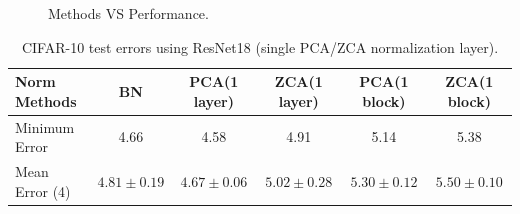 \begin{figure}[!htb]
\begin{floatrow}
{%
  \caption{Methods VS Performance.}%
}
\end{floatrow}
\end{figure}


\begin{table}[!htb]
\begin{centering}
\begin{tabular}{|l|c|c|c|c|c|}
\hline
Norm Methods          & BN        & PCA(1 layer)   & ZCA(1 layer)  & PCA(1 block)   & ZCA(1 block) \\ \hline
Minimum Error         & 4.66      &  4.58  &   4.91 &  5.14 &  5.38\\ \hline
Mean Error (4) & $4.81{\pm}0.19$  &  $4.67{\pm}0.06$  & $5.02{\pm}0.28$ & $5.30{\pm}0.12$ & $5.50{\pm}0.10$ \\ \hline
\end{tabular}
\caption{CIFAR-10 test errors using ResNet18 (single PCA/ZCA normalization layer).}
\end{centering}
\end{table}